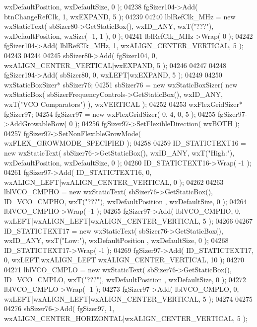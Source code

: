 \begin{DoxyCode}
      wxDefaultPosition, wxDefaultSize, 0 );
04238     fgSizer104->Add( btnChangeRefClk, 1, wxEXPAND, 5 );
04239     
04240     lblRefClk_MHz = \textcolor{keyword}{new} wxStaticText( sbSizer80->GetStaticBox(), wxID\_ANY, wxT(\textcolor{stringliteral}{"???"}), wxDefaultPosition, 
      wxSize( -1,-1 ), 0 );
04241     lblRefClk_MHz->Wrap( 0 );
04242     fgSizer104->Add( lblRefClk_MHz, 1, wxALIGN\_CENTER\_VERTICAL, 5 );
04243     
04244     
04245     sbSizer80->Add( fgSizer104, 0, wxALIGN\_CENTER\_VERTICAL|wxEXPAND, 5 );
04246     
04247     
04248     fgSizer194->Add( sbSizer80, 0, wxLEFT|wxEXPAND, 5 );
04249     
04250     wxStaticBoxSizer* sbSizer76;
04251     sbSizer76 = \textcolor{keyword}{new} wxStaticBoxSizer( \textcolor{keyword}{new} wxStaticBox( sbSizerFrequencyControls->GetStaticBox(), wxID\_ANY, 
      wxT(\textcolor{stringliteral}{"VCO Comparators"}) ), wxVERTICAL );
04252     
04253     wxFlexGridSizer* fgSizer97;
04254     fgSizer97 = \textcolor{keyword}{new} wxFlexGridSizer( 0, 4, 0, 5 );
04255     fgSizer97->AddGrowableRow( 0 );
04256     fgSizer97->SetFlexibleDirection( wxBOTH );
04257     fgSizer97->SetNonFlexibleGrowMode( wxFLEX\_GROWMODE\_SPECIFIED );
04258     
04259     ID_STATICTEXT16 = \textcolor{keyword}{new} wxStaticText( sbSizer76->GetStaticBox(), wxID\_ANY, wxT(\textcolor{stringliteral}{"High:"}), 
      wxDefaultPosition, wxDefaultSize, 0 );
04260     ID_STATICTEXT16->Wrap( -1 );
04261     fgSizer97->Add( ID_STATICTEXT16, 0, wxALIGN\_LEFT|wxALIGN\_CENTER\_VERTICAL, 0 );
04262     
04263     lblVCO_CMPHO = \textcolor{keyword}{new} wxStaticText( sbSizer76->GetStaticBox(), ID_VCO_CMPHO, wxT(\textcolor{stringliteral}{"???"}), wxDefaultPosition
      , wxDefaultSize, 0 );
04264     lblVCO_CMPHO->Wrap( -1 );
04265     fgSizer97->Add( lblVCO_CMPHO, 0, wxLEFT|wxALIGN\_LEFT|wxALIGN\_CENTER\_VERTICAL, 5 );
04266     
04267     ID_STATICTEXT17 = \textcolor{keyword}{new} wxStaticText( sbSizer76->GetStaticBox(), wxID\_ANY, wxT(\textcolor{stringliteral}{"Low:"}), wxDefaultPosition
      , wxDefaultSize, 0 );
04268     ID_STATICTEXT17->Wrap( -1 );
04269     fgSizer97->Add( ID_STATICTEXT17, 0, wxLEFT|wxALIGN\_LEFT|wxALIGN\_CENTER\_VERTICAL, 10 );
04270     
04271     lblVCO_CMPLO = \textcolor{keyword}{new} wxStaticText( sbSizer76->GetStaticBox(), ID_VCO_CMPLO, wxT(\textcolor{stringliteral}{"???"}), wxDefaultPosition
      , wxDefaultSize, 0 );
04272     lblVCO_CMPLO->Wrap( -1 );
04273     fgSizer97->Add( lblVCO_CMPLO, 0, wxLEFT|wxALIGN\_LEFT|wxALIGN\_CENTER\_VERTICAL, 5 );
04274     
04275     
04276     sbSizer76->Add( fgSizer97, 1, wxALIGN\_CENTER\_HORIZONTAL|wxALIGN\_CENTER\_VERTICAL, 5 );

\end{DoxyCode}
